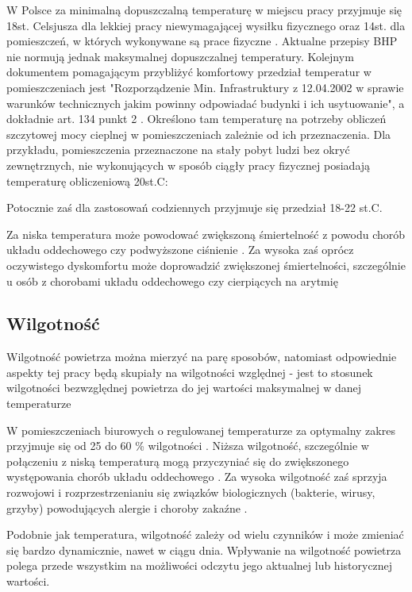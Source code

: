 \documentclass[a4paper, 12pt]{article}
\begin{document}
W Polsce za minimalną dopuszczalną temperaturę w miejscu pracy przyjmuje się 18st. Celsjusza dla 
lekkiej pracy niewymagającej wysiłku fizycznego oraz 14st. dla pomieszczeń, w których wykonywane są prace 
fizyczne \cite{manutan-bhp}. Aktualne przepisy BHP nie normują jednak maksymalnej dopuszczalnej temperatury. 
Kolejnym dokumentem pomagającym przybliżyć komfortowy przedział temperatur w pomieszczeniach jest
"Rozporządzenie Min. Infrastruktury z 12.04.2002 w sprawie warunków technicznych jakim powinny odpowiadać 
budynki i ich usytuowanie", a dokładnie art. 134 punkt 2 \cite{rozp-bud}. Określono tam temperaturę na potrzeby obliczeń szczytowej 
mocy cieplnej w pomieszczeniach zależnie od ich przeznaczenia.
Dla przykładu, pomieszczenia przeznaczone na stały pobyt ludzi bez okryć zewnętrznych, nie wykonujących 
w sposób ciągły pracy fizycznej posiadają temperaturę obliczeniową 20st.C:

Potocznie zaś dla zastosowań codziennych przyjmuje się przedział 18-22 st.C.

Za niska temperatura może powodować zwiększoną śmiertelność z powodu chorób układu oddechowego czy podwyższone 
ciśnienie \cite{who-cold}. Za wysoka zaś oprócz oczywistego dyskomfortu może doprowadzić zwiększonej śmiertelności, 
szczególnie u osób z chorobami układu oddechowego czy cierpiących na arytmię \cite{bmj-heat}

\subsection{Wilgotność}

Wilgotność powietrza można mierzyć na parę sposobów, natomiast odpowiednie aspekty tej pracy będą 
skupiały na wilgotności względnej - jest to stosunek wilgotności bezwzględnej powietrza do jej wartości 
maksymalnej w danej temperaturze \cite{termodynamika}

W pomieszczeniach biurowych o regulowanej temperaturze za optymalny zakres przyjmuje się 
od 25 do 60 \% wilgotności \cite{inz-bud}. Niższa wilgotność, szczególnie w połączeniu z niską temperaturą 
mogą przyczyniać się do zwiększonego występowania chorób układu oddechowego \cite{low-hum}. Za wysoka wilgotność 
zaś sprzyja rozwojowi i rozprzestrzenianiu się związków biologicznych (bakterie, wirusy, grzyby) 
powodujących alergie i choroby zakaźne \cite{high-hum}.

Podobnie jak temperatura, wilgotność zależy od wielu czynników i może zmieniać się bardzo dynamicznie, 
nawet w ciągu dnia. Wpływanie na wilgotność powietrza polega przede wszystkim na możliwości odczytu 
jego aktualnej lub historycznej wartości.
\end{document}
